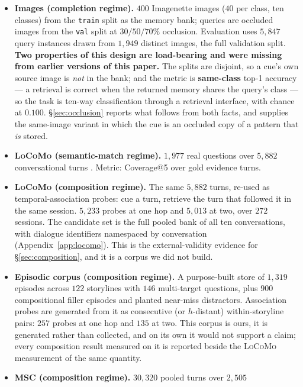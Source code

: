 \begin{itemize}\itemsep2pt
\item \textbf{Images (completion regime).} $400$ Imagenette images ($40$ per class, ten
  classes) from the \texttt{train} split as the memory bank; queries are occluded images
  from the \texttt{val} split at $30/50/70\%$ occlusion. Evaluation uses $5{,}847$ query
  instances drawn from $1{,}949$ distinct images, the full validation split. \textbf{Two
  properties of this design are load-bearing and were missing from earlier versions of this
  paper.} The splits are disjoint, so a cue's own source image is \emph{not} in the bank;
  and the metric is \textbf{same-class} top-1 accuracy --- a retrieval is correct when the
  returned memory shares the query's class --- so the task is ten-way classification through
  a retrieval interface, with chance at $0.100$. \S\ref{sec:occlusion} reports what follows
  from both facts, and  supplies the same-image variant in which the cue is an
  occluded copy of a pattern that \emph{is} stored.
\item \textbf{\textsc{LoCoMo} (semantic-match regime).} $1{,}977$ real questions over
  $5{,}882$ conversational turns \citep{maharana2024locomo}. Metric: Coverage@5 over gold
  evidence turns.
\item \textbf{\textsc{LoCoMo} (composition regime).} The same $5{,}882$ turns, re-used as
  temporal-association probes: cue a turn, retrieve the turn that followed it in the same
  session. $5{,}233$ probes at one hop and $5{,}013$ at two, over $272$ sessions. The
  candidate set is the full pooled bank of all ten conversations, with dialogue identifiers
  namespaced by conversation (Appendix~\ref{app:locomo}). This is the external-validity
  evidence for \S\ref{sec:composition}, and it is a corpus we did not build.
\item \textbf{Episodic corpus (composition regime).} A purpose-built store of $1{,}319$
  episodes across $122$ storylines with $146$ multi-target questions, plus $900$
  compositional filler episodes and planted near-miss distractors. Association probes are
  generated from it as consecutive (or $h$-distant) within-storyline pairs: $257$ probes at
  one hop and $135$ at two. This corpus is ours, it is generated rather than collected, and
  on its own it would not support a claim; every composition result measured on it is
  reported beside the \textsc{LoCoMo} measurement of the same quantity.
\item \textbf{\textsc{MSC} (composition regime).} $30{,}320$ pooled turns over $2{,}505$

\end{itemize}
